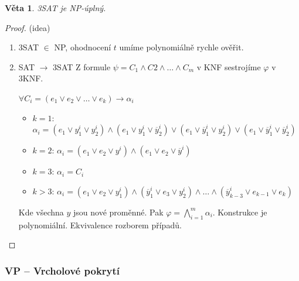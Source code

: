 \documentclass[11pt]{report} %
\newtheorem{theorem}{Věta}[section]
\numberwithin{equation}{section}
\begin{document}
\begin{theorem}
	3SAT je NP-úplný.
\end{theorem}
\begin{proof}(idea)
	\begin{enumerate}

	
	
	\item 3SAT $\in$ NP, ohodnocení $t$ umíme polynomiálně rychle ověřit.
	
	\item SAT $\rightarrow$ 3SAT
	Z formule $\psi = C_1 \wedge C2 \wedge \dots \wedge C_m$ v KNF sestrojíme $\varphi$ v 3KNF.
	
	$\forall C_i = (e_1 \vee e_2 \vee \dots \vee e_k) \rightarrow \alpha_i$
	\begin{itemize}
		
		
		\item $k = 1$: \quad $\alpha_i = (e_1 \vee y_1^i \vee y_2^i) \wedge (e_1 \vee y_1^i \vee \overline{y}_2^i) \vee (e_1 \vee \overline{y}_1^i \vee y_2^i) \vee (e_1 \vee \overline{y}_1^i \vee \overline{y}_2^i)$
		
		\item $k = 2$: \quad $\alpha_i = (e_1 \vee e_2 \vee y^i) \wedge (e_1 \vee e_2 \vee \overline{y}^i)$
		
		\item $k = 3$: \quad $\alpha_i = C_i$
		
		\item $k > 3$: \quad $\alpha_i = (e_1 \vee e_2 \vee y_1^i) \wedge (\overline{y}_1^i \vee e_3 \vee y_2^i) \wedge \dots \wedge (\overline{y}_{k-3}^i \vee e_{k-1} \vee e_k)$
	\end{itemize}
	Kde všechna $y$ jsou nové proměnné. Pak $\varphi = \bigwedge\limits_{i=1}^m{\alpha_i}$. Konstrukce je polynomiální. Ekvivalence rozborem případů.
	\end{enumerate}
\end{proof}


\subsubsection{VP -- Vrcholové pokrytí}
\begin{minipage}{\textwidth}
	\bigskip
	\centering
	\bigskip
\end{minipage}
\end{document}
